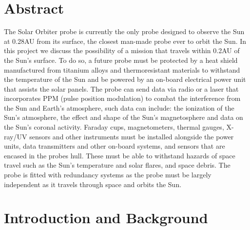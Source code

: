 \documentclass[12pt]{article}
\begin{document}



\section{Abstract} 
\label{Abstract}

The Solar Orbiter probe is currently the only probe designed to observe the Sun at 0.28AU from its surface, the closest man-made probe ever to orbit the Sun. In this project we discuss the possibility of a mission that travels within 0.2AU of the Sun's surface. To do so, a future probe must be protected by a heat shield manufactured from titanium alloys and thermoresistant materials to withstand the temperature of the Sun and be powered by an on-board electrical power unit that assists the solar panels. The probe can send data via radio or a laser that incorporates PPM (pulse position modulation) to combat the interference from the Sun and Earth's atmosphere, such data can include: the ionization of the Sun’s atmosphere, the effect and shape of the Sun's magnetosphere and data on the Sun’s coronal activity. Faraday cups, magnetometers, thermal gauges, X-ray/UV sensors and other instruments must be installed alongside the power units, data transmitters and other on-board systems, and sensors that are encased in the probes hull. These must be able to withstand  hazards of space travel such as the Sun's temperature and solar flares, and space debris. The probe is fitted with redundancy systems as the probe must be largely independent as it travels through space and orbits the Sun. 


\section{Introduction and Background} \label{Introduction}
\end{document}
